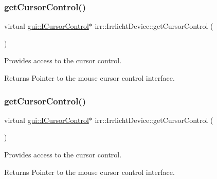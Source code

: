 \subsubsection{\texorpdfstring{get\+Cursor\+Control()}{getCursorControl()}\hspace{0.1cm}{\footnotesize\ttfamily [2/3]}}
{\footnotesize\ttfamily virtual \hyperlink{classirr_1_1gui_1_1ICursorControl}{gui\+::\+I\+Cursor\+Control}$\ast$ irr\+::\+Irrlicht\+Device\+::get\+Cursor\+Control (\begin{DoxyParamCaption}{ }\end{DoxyParamCaption})\hspace{0.3cm}{\ttfamily [pure virtual]}}



Provides access to the cursor control. 

\begin{DoxyReturn}{Returns}
Pointer to the mouse cursor control interface. 
\end{DoxyReturn}
\mbox{\label{classirr_1_1IrrlichtDevice_a500a3b7bf69487ff7e2075dd0b0db529}} 
\subsubsection{\texorpdfstring{get\+Cursor\+Control()}{getCursorControl()}\hspace{0.1cm}{\footnotesize\ttfamily [3/3]}}
{\footnotesize\ttfamily virtual \hyperlink{classirr_1_1gui_1_1ICursorControl}{gui\+::\+I\+Cursor\+Control}$\ast$ irr\+::\+Irrlicht\+Device\+::get\+Cursor\+Control (\begin{DoxyParamCaption}{ }\end{DoxyParamCaption})\hspace{0.3cm}{\ttfamily [pure virtual]}}



Provides access to the cursor control. 

\begin{DoxyReturn}{Returns}
Pointer to the mouse cursor control interface. 
\end{DoxyReturn}
\mbox{\label{classirr_1_1IrrlichtDevice_a26227e20e46915942d067532c61df42b}} 
